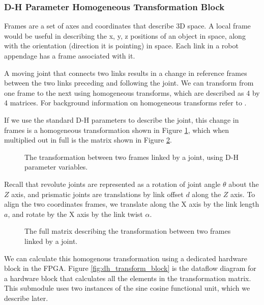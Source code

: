 \subsubsection{D-H Parameter Homogeneous Transformation Block}

Frames are a set of axes and coordinates that describe 3D space. A local frame would be useful in describing the x, y, z positions of an object in space, along with the orientation (direction it is pointing) in space. Each link in a robot appendage has a frame associated with it.

A moving joint that connects two links results in a change in reference frames between the two links preceding and following the joint. We can transform from one frame to the next using homogeneous transforms, which are described as 4 by 4 matrices. For background information on homogeneous transforms refer to \cite{frames}.

If we use the standard D-H parameters to describe the joint, this change in frames is a homogeneous transformation shown in Figure \ref{fig:dh_transform_equation}, which when multiplied out in full is the matrix shown in Figure \ref{fig:dh_transform_matrix}. 

\begin{figure}[ht]
\center
{}
\caption{The transformation between two frames linked by a joint, using D-H parameter variables.}
\label{fig:dh_transform_equation}
\end{figure}

Recall that revolute joints are represented as a rotation of joint angle $\theta$ about the $Z$ axis, and prismatic joints are translations by link offset $d$ along the $Z$ axis. To align the two coordinates frames, we translate along the X axis by the link length $a$, and rotate by the X axis by the link twist $\alpha$.

\begin{figure}[ht]
\center
{}
\caption{The full matrix describing the transformation between two frames linked by a joint.}
\label{fig:dh_transform_matrix}
\end{figure}

We can calculate this homogenous transformation using a dedicated hardware block in the FPGA. Figure \ref{fig:dh_transform_block} is the dataflow diagram for a hardware block that calculates all the elements in the transformation matrix. This submodule uses two instances of the sine cosine functional unit, which we describe later.

